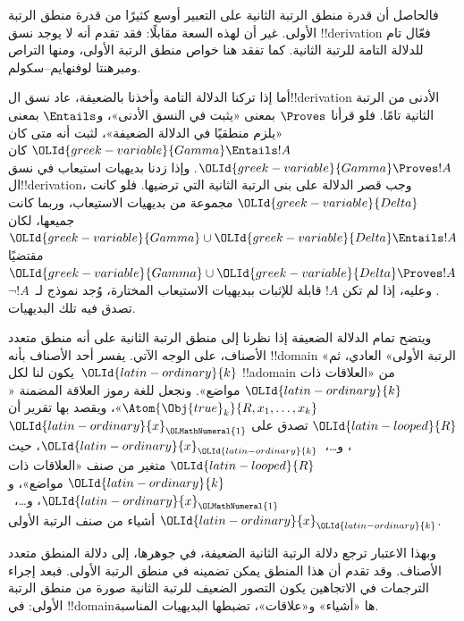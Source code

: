 \documentclass[../../../include/open-logic-section]{subfiles}
\begin{document}
فالحاصل أن قدرة منطق الرتبة الثانية على التعبير أوسع كثيرًا
من قدرة منطق الرتبة الأولى. غير أن لهذه السعة مقابلًا: فقد
تقدم أنه لا يوجد نسق !!{derivation} فعّال تام للدلالة التامة
للرتبة الثانية. كما تفقد هنا خواص منطق الرتبة الأولى، ومنها
التراص ومبرهنتا لوفنهايم--سكولم.

أما إذا تركنا الدلالة التامة وأخذنا بالضعيفة، عاد نسق
ال!!{derivation} الأدنى من الرتبة الثانية تامًا. فلو قرأنا
$\Proves$ بمعنى «يثبت في النسق الأدنى»، و$\Entails$ بمعنى
«يلزم منطقيًا في الدلالة الضعيفة»، لثبت أنه متى كان
${\OLId{greek-variable}{Gamma}} \Entails !A$ كان ${\OLId{greek-variable}{Gamma}} \Proves
!A$. وإذا زدنا بديهيات استيعاب في نسق ال!!{derivation}، وجب
قصر الدلالة على بنى الرتبة الثانية التي ترضيها. فلو كانت
${\OLId{greek-variable}{Delta}}$ مجموعة من بديهيات الاستيعاب، وربما كانت جميعها، لكان
${\OLId{greek-variable}{Gamma}} \cup {\OLId{greek-variable}{Delta}} \Entails
!A$ مقتضيًا ${\OLId{greek-variable}{Gamma}} \cup {\OLId{greek-variable}{Delta}} \Proves !A$.
وعليه، إذا لم تكن $!A$ قابلة للإثبات ببديهيات الاستيعاب
المختارة، وُجد نموذج لـ~$\lnot !A$ تصدق فيه تلك البديهيات.

ويتضح تمام الدلالة الضعيفة إذا نظرنا إلى منطق الرتبة الثانية
على أنه منطق متعدد الأصناف، على الوجه الآتي.
يفسر أحد الأصناف بأنه !!{domain} «الرتبة الأولى» العادي، ثم يكون لنا
لكل~${\OLId{latin-ordinary}{k}}$ !!a{domain} من «العلاقات ذات ${\OLId{latin-ordinary}{k}}$ مواضع». ونجعل للغة رموز
العلاقة المضمنة «$\Atom{\Obj{true}_k}{R,x_1,\dots,x_k}$»، ويقصد بها
تقرير أن ${\OLId{latin-looped}{R}}$ تصدق على ${\OLId{latin-ordinary}{x}}_{\OLMathNumeral{1}}$، و\dots،~${\OLId{latin-ordinary}{x}}_{\OLId{latin-ordinary}{k}}$، حيث ${\OLId{latin-looped}{R}}$ متغير من صنف
«العلاقات ذات ${\OLId{latin-ordinary}{k}}$ مواضع»، و${\OLId{latin-ordinary}{x}}_{\OLMathNumeral{1}}$، و\dots،~${\OLId{latin-ordinary}{x}}_{\OLId{latin-ordinary}{k}}$ أشياء من صنف الرتبة
الأولى.

وبهذا الاعتبار ترجع دلالة الرتبة الثانية الضعيفة، في جوهرها،
إلى دلالة المنطق متعدد الأصناف. وقد تقدم أن هذا المنطق يمكن
تضمينه في منطق الرتبة الأولى. فبعد إجراء الترجمات في الاتجاهين
يكون التصور الضعيف للرتبة الثانية صورة من منطق الرتبة الأولى:
في !!{domain}ها «أشياء» و«علاقات»، تضبطها البديهيات المناسبة.
\end{document}
